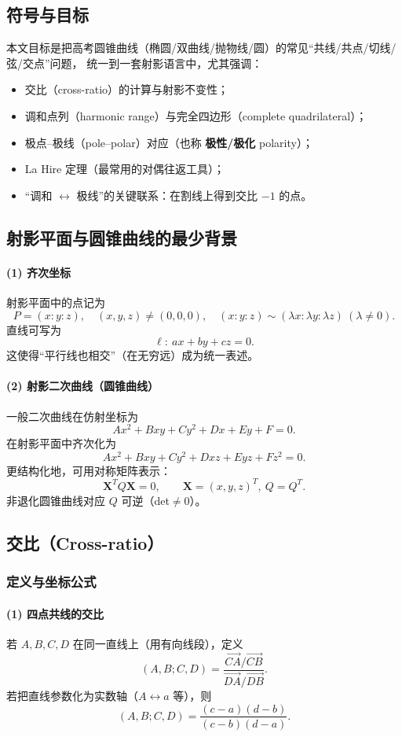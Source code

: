 \documentclass[UTF8]{ctexart}
\begin{document}
	\subsection{符号与目标}
	本文目标是把高考圆锥曲线（椭圆/双曲线/抛物线/圆）的常见“共线/共点/切线/弦/交点”问题，
	统一到一套射影语言中，尤其强调：
	\begin{itemize}
		\item 交比（cross-ratio）的计算与射影不变性；
		\item 调和点列（harmonic range）与完全四边形（complete quadrilateral）；
		\item 极点--极线（pole--polar）对应（也称 \textbf{极性/极化} polarity）；
		\item La Hire 定理（最常用的对偶往返工具）；
		\item “调和 $\leftrightarrow$ 极线”的关键联系：在割线上得到交比 $-1$ 的点。
	\end{itemize}
	
	\subsection{射影平面与圆锥曲线的最少背景}
	\paragraph{(1) 齐次坐标}
	射影平面中的点记为
	\[
	P=(x:y:z),\quad (x,y,z)\neq (0,0,0),\quad (x:y:z)\sim (\lambda x:\lambda y:\lambda z)\ (\lambda\neq 0).
	\]
	直线可写为
	\[
	\ell:\ ax+by+cz=0.
	\]
	这使得“平行线也相交”（在无穷远）成为统一表述。
	
	\paragraph{(2) 射影二次曲线（圆锥曲线）}
	一般二次曲线在仿射坐标为
	\[
	Ax^2+Bxy+Cy^2+Dx+Ey+F=0.
	\]
	在射影平面中齐次化为
	\[
	Ax^2+Bxy+Cy^2+Dxz+Eyz+Fz^2=0.
	\]
	更结构化地，可用对称矩阵表示：
	\[
	\mathbf{X}^TQ\mathbf{X}=0,\qquad \mathbf{X}=(x,y,z)^T,\ Q=Q^T.
	\]
	非退化圆锥曲线对应 $Q$ 可逆（det$\neq 0$）。
	
	\subsection{交比（Cross-ratio）}
	\subsubsection{定义与坐标公式}
	\paragraph{(1) 四点共线的交比}
	若 $A,B,C,D$ 在同一直线上（用有向线段），定义
	\[
	(A,B;C,D)=\frac{\overrightarrow{CA}/\overrightarrow{CB}}{\overrightarrow{DA}/\overrightarrow{DB}}.
	\]
	若把直线参数化为实数轴（$A\leftrightarrow a$ 等），则
	\[
	(A,B;C,D)=\frac{(c-a)(d-b)}{(c-b)(d-a)}.
	\]
	
\end{document}

